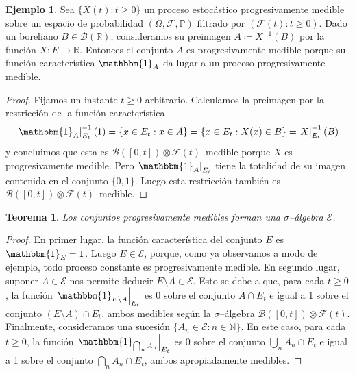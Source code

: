 \documentclass{report}
\newcommand{\restrict}[2]{\left.#1\right|_{#2}}
\newcommand{\characteristic}{\mathbbm{1}}
\newcommand{\prob}{\mathbb{P}}
\newcommand{\events}{\mathcal{F}}
\newcommand{\borel}{\mathscr{B}}
\newcommand{\progressiveAlgebra}{\mathscr{E}}
\newcommand{\naturalNumbers}{\mathbb{N}}
\newcommand{\realNumbers}{\mathbb{R}}
\theoremstyle{plain}
\newtheorem{theorem}{Teorema}
\newtheorem{property}{Propiedad}
\theoremstyle{remark}
\theoremstyle{definition}
\newtheorem{example}{Ejemplo}
\begin{document}
\begin{example}
  \label{example:progressivelyMeasurablePreimage}
  Sea \(\{X(t) : t \geq 0\}\) un proceso estocástico progresivamente medible sobre un espacio de probabilidad \((\Omega, \events, \prob)\) filtrado por \((\events(t) : t \geq 0)\).
  Dado un boreliano \(B \in \borel(\realNumbers)\), consideramos su preimagen \(A \coloneqq X^{- 1}(B)\) por la función \(X : E \rightarrow \realNumbers\).
  Entonces el conjunto \(A\) es progresivamente medible porque su función característica \(\characteristic_A\) da lugar a un proceso progresivamente medible.
\end{example}
\begin{proof}
  Fijamos un instante \(t \geq 0\) arbitrario.
  Calculamos la preimagen por la restricción de la función característica
  \begin{align}
    \restrict{\characteristic_A}{E_t}^{- 1} (1)
    =
      \{x \in E_t : x \in A\}
    =
      \{x \in E_t : X(x) \in B\}
    =
      \restrict{X}{E_t}^{- 1}(B)
  \end{align}
  y concluimos que esta es \(\borel([0, t]) \otimes \events(t)\)--medible porque \(X\) es progresivamente medible.
  Pero \(\restrict{\characteristic_A}{E_t}\) tiene la totalidad de su imagen contenida en el conjunto \(\{0, 1\}\).
  Luego esta restricción también es \(\borel([0, t]) \otimes \events(t)\)--medible.
\end{proof}


\begin{theorem}
  Los conjuntos progresivamente medibles forman una \(\sigma\)--álgebra \(\progressiveAlgebra\).
\end{theorem}
\begin{proof}
  En primer lugar, la función característica del conjunto \(E\) es \({\characteristic_E = 1}\).
  Luego \(E \in \progressiveAlgebra\), porque, como ya observamos a modo de ejemplo, todo proceso constante es progresivamente medible.
  En segundo lugar, suponer \(A \in \progressiveAlgebra\) nos permite deducir \(E \setminus A \in \progressiveAlgebra\).
  Esto se debe a que, para cada \(t \geq 0\), la función \(\restrict{\characteristic_{E \setminus A}}{E_t}\) es 0 sobre el conjunto \(A \cap E_t\) e igual a 1 sobre el conjunto \((E \setminus A) \cap E_t\), ambos medibles según la \(\sigma\)--álgebra \(\borel([0, t]) \otimes \events(t)\).
  Finalmente, consideramos una sucesión \(\{A_n \in \progressiveAlgebra : n \in \naturalNumbers\}\).
  En este caso, para cada \(t \geq 0\), la función \(\restrict{\characteristic_{\bigcap_n A_n}}{E_t}\)
  es 0 sobre el conjunto \(\bigcup_n A_n \cap E_t\) e igual a 1 sobre el conjunto \(\bigcap_n A_n \cap E_t\), ambos apropiadamente medibles.
\end{proof}
\end{document}

